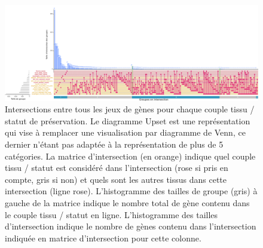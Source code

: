 \begin{landscape}
\begin{figure}[p]
  \centering
  \includegraphics[width=1.5\textheight]{img/chap2/chap2_upset_genes_unpres_modpres_by_tissue.pdf}
  \caption{Intersections entre tous les jeux de gènes pour chaque couple tissu / statut de préservation. Le diagramme Upset est une représentation qui vise à remplacer une visualisation par diagramme de Venn, ce dernier n'étant pas adaptée à la représentation de plus de 5 catégories. La matrice d'intersection (en orange) indique quel couple tissu / statut est considéré dans l'intersection (rose si pris en compte, gris si non) et quels sont les autres tissus dans cette intersection (ligne rose). L'histogramme des tailles de groupe (gris) à gauche de la matrice indique le nombre total de gène contenu dans le couple tissu / statut en ligne. L'histogramme des tailles d'intersection indique le nombre de gènes contenu dans l'intersection indiquée en matrice d'intersection pour cette colonne.}
  \label{figure:upset_intersection_genes_tissu_unpres_modpres}
\end{figure}
\end{landscape}

